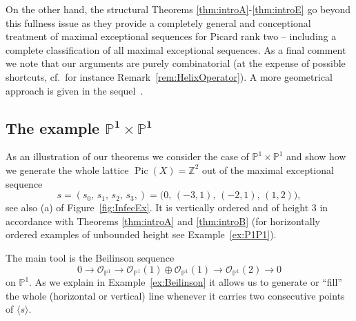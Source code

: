 \documentclass[11pt]{article}
\theoremstyle{definition}
\numberwithin{equation}{section}
\newcommand{\PP}{\mathbb P}
\newcommand{\Z}{\mathbb Z}
\newcommand{\CO}{{\mathcal O}}
\newcommand{\Pic}{\operatorname{Pic}}
\newcommand{\cl}{s}
\newcommand{\mes}{maximal exceptional sequence}
\newcommand{\thLex}{\ref{thm:introA}}
\newcommand{\thHeight}{\ref{thm:introB}}
\newcommand{\thFull}{\ref{thm:introE}}
\begin{document}
{On the other hand, the structural Theorems {\thLex}-{\thFull} 
go beyond this fullness issue as they provide a completely general 
and conceptional treatment of \mes s for Picard rank two
-- including a complete classification of all \mes s}. As a final 
comment we note that our arguments are purely
combinatorial (at the expense of possible shortcuts, cf.\ 
for instance Remark~\ref{rem:HelixOperator}). 
A more geometrical approach is given 
in the sequel~\cite{exsec}.

\subsection{The example \texorpdfstring{$\mathbf{\PP^1\times\PP^1}$}{P1 x P1}}
\label{subsec:GenDerCat}
As an illustration of our theorems we consider the case of
$\PP^1\times\PP^1$ and show how we generate the 
whole lattice $\Pic(X)=\Z^2$ out of the maximal 
exceptional sequence 
$$
\cl=(\cl_0,\,\cl_1,\,\cl_2,\,\cl_3,)=
\big(0,\,(-3,1),\,(-2,1),\,(1,2)\big),
$$
see also (a) of Figure~\ref{fig:InfecEx}. It 
is vertically ordered and of height $3$ in 
accordance with Theorems {\thLex} and {\thHeight} 
(for horizontally ordered examples of unbounded 
height see Example~\ref{ex:P1P1}).

The main tool is the Beilinson sequence
$$
0\to\CO_{\PP^1}\to\CO_{\PP^1}(1)\oplus\CO_{\PP^1}(1)
\to\CO_{\PP^1}(2)\to0
$$
on $\PP^1$. As we explain in Example~\ref{ex:Beilinson}
it allows us to generate or ``fill'' the whole 
(horizontal or vertical) line whenever it carries two 
consecutive points of $\langle\cl\rangle$.
\end{document}

